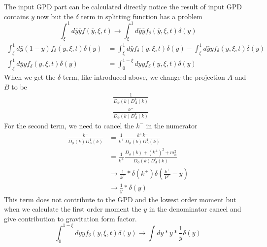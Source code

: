 \documentclass[preprintnumbers,prd,superscriptaddress,preprint]{revtex4-1}
\begin{document}
	The input GPD part can be calculated directly notice the result of input GPD contains $\bar{y}$ now but the $\delta$ term in splitting function has a problem
	\[
	\int_{\xi}^{1}d\bar{y}\bar{y}f(\bar{y},\xi,t)\rightarrow\int_{\xi}^{1}d\bar{y}\bar{y}f_{\delta}(\bar{y},\xi,t)\delta(y)
	\]
	\begin{align*}
		\int_{\xi}^{1}d\bar{y}(1-y)f_{\delta}(y,\xi,t)\delta(y) & =\int_{\xi}^{1}d\bar{y}f_{\delta}(y,\xi,t)\delta(y)-\int_{\xi}^{1}d\bar{y}yf_{\delta}(y,\xi,t)\delta(y)\\
		\int_{\xi}^{1}d\bar{y}yf_{\delta}(y,\xi,t)\delta(y) & =\int_{0}^{1-\xi}dyyf_{\delta}(y,\xi,t)\delta(y)
	\end{align*}
	When we get the $\delta$ term, like introduced above, we change the projection $A$ and $B$ to be
	\begin{align}
		& \frac{1}{D_{\phi}(k) D^{4}_{\Lambda}(k)}\\
		& \frac{k^{-}}{D_{\phi}(k) D^{4}_{\Lambda}(k)}
	\end{align}
	For the second term, we need to cancel the $k^{-}$ in the numerator  
	\begin{align}
		\frac{k^{-}}{D_{\phi}(k)D_{\Lambda}^{4}(k)} & =\frac{1}{k^{+}}\frac{k^{+}k^{-}}{D_{\phi}(k)D_{\Lambda}^{4}(k)}\\
		& =\frac{1}{k^{+}}\frac{D_{\phi}(k)+(k^{\perp})^{2}+m_{\phi}^{2}}{D_{\phi}(k)D_{\Lambda}^{4}(k)}\\
		& \rightarrow\frac{1}{k^{+}}*\delta(k^{+})\delta(\frac{k^{+}}{P^{+}}-y)\\
		& \rightarrow\frac{1}{y}*\delta(y)
	\end{align}
	This term does not contribute to the GPD and the lowest order moment but when we calculate the first order moment the $y$ in the denominator cancel and give contribution to gravitation form factor.
	\[
	\int_{0}^{1-\xi}dyyf_{\delta}(y,\xi,t)\delta(y)\rightarrow\int dy*y*\frac{1}{y}\delta(y)
	\]
	
\end{document}
